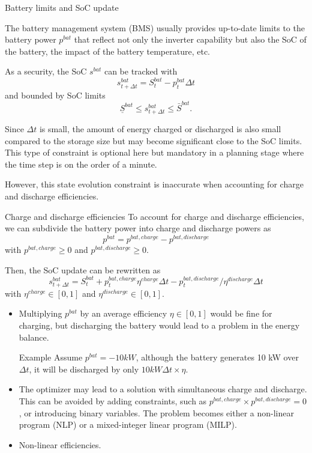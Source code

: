 \begin{frame}[allowframebreaks]{Battery limits and SoC update}

    The battery management system (BMS) usually provides up-to-date limits to the battery power $p^{bat}$ that reflect not only the inverter capability but also the SoC of the battery, the impact of the battery temperature, etc.
    
    As a security, the SoC $s^{bat}$ can be tracked with 
    $$s^{bat}_{t+\Delta t} = S^{bat}_{t} - p^{bat}_t  \Delta t$$
    and bounded by SoC limits
    $$ \underline{S}^{bat} \leq s^{bat}_{t+\Delta t} \leq \bar{S}^{bat}.$$

    Since $\Delta t$ is small, the amount of energy charged or discharged is also small compared to the storage size but may become significant close to the SoC limits.
    This type of constraint is optional here but mandatory in a planning stage where the time step is on the order of a minute.

    \alert{However, this state evolution constraint is inaccurate when accounting for charge and discharge efficiencies.}
\end{frame}

\begin{frame}[allowframebreaks]{Charge and discharge efficiencies}
    To account for charge and discharge efficiencies, we can subdivide the battery power into charge and discharge powers as 
    $$ p^{bat} = p^{bat, charge} - p^{bat, discharge}$$
    with $p^{bat, charge} \geq 0$ and $p^{bat, discharge} \geq 0$.

    Then, the SoC update can be rewritten as
    $$s^{bat}_{t+\Delta t} = S^{bat}_{t} + p^{bat, charge}_t  \eta^{charge} \Delta t - p^{bat, discharge}_t / \eta^{discharge} \Delta t $$
    with $\eta^{charge} \in [0,1]$ and $\eta^{discharge} \in [0,1]$.

    \begin{itemize}
        \item Multiplying $p^{bat}$ by an average efficiency $\eta \in [0,1]$ would be fine for charging, but discharging the battery would lead to a problem in the energy balance.
        \begin{block}{Example}
            Assume $p^{bat} = -10 kW$, although the battery generates 10 kW over $\Delta t$, it will be discharged by only $10 kW \Delta t \times \eta$.    
        \end{block}
        \item The optimizer may lead to a solution with simultaneous charge and discharge. 
        This can be avoided by adding constraints, such as $p^{bat, charge} \times p^{bat, discharge} = 0$, or introducing binary variables. The problem becomes either a non-linear program (NLP) or a mixed-integer linear program (MILP).
        \item Non-linear efficiencies.
    \end{itemize}
\end{frame}

